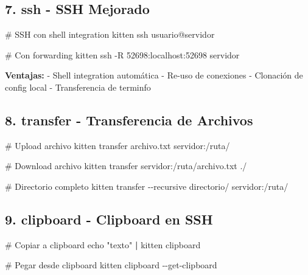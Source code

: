 \documentclass[
  doc,
  floatsintext,
  longtable,
  a4paper,
  nolmodern,
  notxfonts,
  notimes,
  12pt,
  colorlinks=true,linkcolor=blue,citecolor=blue,urlcolor=blue]{apa7}
\newenvironment{Shaded}{\begin{snugshade}}{\end{snugshade}}
\newcommand{\AttributeTok}[1]{\textcolor[rgb]{0.40,0.45,0.13}{#1}}
\newcommand{\BuiltInTok}[1]{\textcolor[rgb]{0.00,0.23,0.31}{#1}}
\newcommand{\CommentTok}[1]{\textcolor[rgb]{0.37,0.37,0.37}{#1}}
\newcommand{\ExtensionTok}[1]{\textcolor[rgb]{0.00,0.23,0.31}{#1}}
\newcommand{\KeywordTok}[1]{\textcolor[rgb]{0.00,0.23,0.31}{\textbf{#1}}}
\newcommand{\NormalTok}[1]{\textcolor[rgb]{0.00,0.23,0.31}{#1}}
\newcommand{\StringTok}[1]{\textcolor[rgb]{0.13,0.47,0.30}{#1}}
\begin{document}
\subsection{7. ssh - SSH Mejorado}\label{ssh---ssh-mejorado}

\begin{Shaded}
\begin{Highlighting}[]
\CommentTok{\# SSH con shell integration}
\ExtensionTok{kitten}\NormalTok{ ssh usuario@servidor}

\CommentTok{\# Con forwarding}
\ExtensionTok{kitten}\NormalTok{ ssh }\AttributeTok{{-}R}\NormalTok{ 52698:localhost:52698 servidor}
\end{Highlighting}
\end{Shaded}

\textbf{Ventajas:} - Shell integration automática - Re-uso de conexiones
- Clonación de config local - Transferencia de terminfo

\subsection{8. transfer - Transferencia de
Archivos}\label{transfer---transferencia-de-archivos}

\begin{Shaded}
\begin{Highlighting}[]
\CommentTok{\# Upload archivo}
\ExtensionTok{kitten}\NormalTok{ transfer archivo.txt servidor:/ruta/}

\CommentTok{\# Download archivo}
\ExtensionTok{kitten}\NormalTok{ transfer servidor:/ruta/archivo.txt ./}

\CommentTok{\# Directorio completo}
\ExtensionTok{kitten}\NormalTok{ transfer }\AttributeTok{{-}{-}recursive}\NormalTok{ directorio/ servidor:/ruta/}
\end{Highlighting}
\end{Shaded}

\subsection{9. clipboard - Clipboard en
SSH}\label{clipboard---clipboard-en-ssh}

\begin{Shaded}
\begin{Highlighting}[]
\CommentTok{\# Copiar a clipboard}
\BuiltInTok{echo} \StringTok{"texto"} \KeywordTok{|} \ExtensionTok{kitten}\NormalTok{ clipboard}

\CommentTok{\# Pegar desde clipboard}
\ExtensionTok{kitten}\NormalTok{ clipboard }\AttributeTok{{-}{-}get{-}clipboard}
\end{Highlighting}
\end{Shaded}
\end{document}
